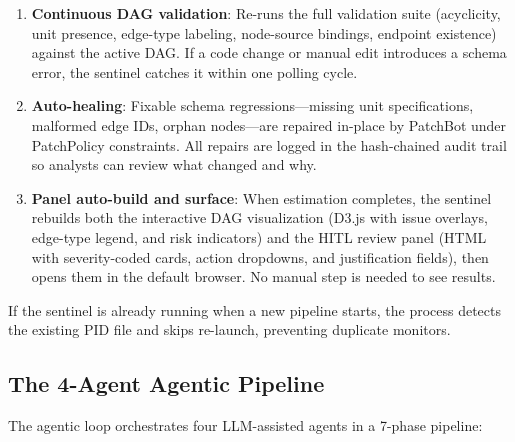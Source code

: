 \documentclass{article}
\begin{document}
\begin{enumerate}[leftmargin=*, itemsep=1pt]
    \item \textbf{Continuous DAG validation}: Re-runs the full validation suite (acyclicity, unit presence, edge-type labeling, node-source bindings, endpoint existence) against the active DAG. If a code change or manual edit introduces a schema error, the sentinel catches it within one polling cycle.

    \item \textbf{Auto-healing}: Fixable schema regressions---missing unit specifications, malformed edge IDs, orphan nodes---are repaired in-place by PatchBot under PatchPolicy constraints. All repairs are logged in the hash-chained audit trail so analysts can review what changed and why.

    \item \textbf{Panel auto-build and surface}: When estimation completes, the sentinel rebuilds both the interactive DAG visualization (D3.js with issue overlays, edge-type legend, and risk indicators) and the HITL review panel (HTML with severity-coded cards, action dropdowns, and justification fields), then opens them in the default browser. No manual step is needed to see results.
\end{enumerate}

If the sentinel is already running when a new pipeline starts, the process detects the existing PID file and skips re-launch, preventing duplicate monitors.

\subsection{The 4-Agent Agentic Pipeline}

The agentic loop orchestrates four LLM-assisted agents in a 7-phase pipeline:
\end{document}
